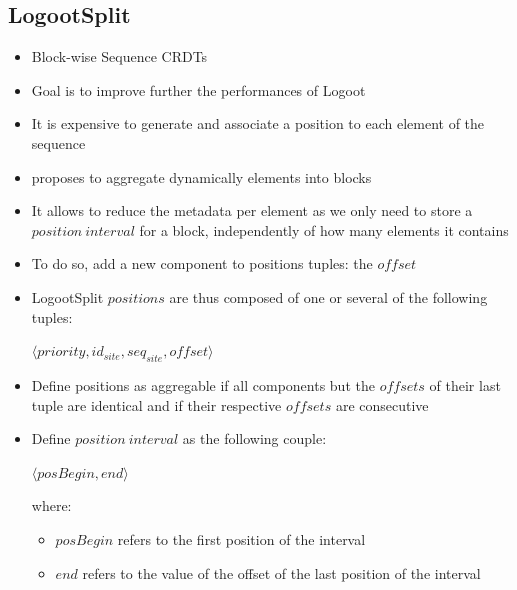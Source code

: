 \documentclass{article}
\newcommand{\tuple}[1]{\langle #1 \rangle}
\theoremstyle{definition}
\newcounter{note-counter}
\theoremstyle{definition}
\theoremstyle{definition}
\begin{document}
\subsection{LogootSplit \cite{AndreCollaborateCom2013}}

\begin{itemize}
    \item Block-wise Sequence \acp{CRDT}
    \item Goal is to improve further the performances of Logoot
    \item It is expensive to generate and associate a position to each element of the sequence
    \item \textcite{AndreCollaborateCom2013} proposes to aggregate dynamically elements into blocks
    \item It allows to reduce the metadata per element as we only need to store a $position \ interval$ for a block, independently of how many elements it contains
    \item To do so, add a new component to positions tuples: the $offset$ 
    \item LogootSplit $positions$ are thus composed of one or several of the following tuples:

    \begin{center}
        $\tuple{priority, id_{site}, seq_{site}, offset}$
    \end{center}

    \item Define positions as aggregable if all components but the $offsets$ of their last tuple are identical and if their respective $offsets$ are consecutive
    \item Define $position \ interval$ as the following couple:

    \begin{center}
        $\tuple{posBegin, end}$
    \end{center}

    where:

    \begin{itemize}
        \item $posBegin$ refers to the first position of the interval
        \item $end$ refers to the value of the offset of the last position of the interval
    \end{itemize}


\end{itemize}
\end{document}
